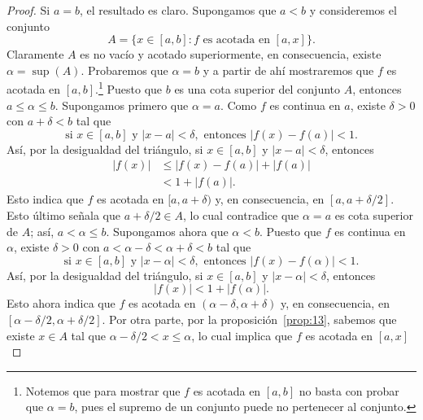 \documentclass[12pt,a4paper]{book}
\begin{document}
    \begin{proof}
        Si $a=b$, el resultado es claro. Supongamos que $a<b$ y
        consideremos el conjunto
        \begin{equation*}
            A=\{x\in[a,b]:f\text{ es acotada en }[a,x]\}.
        \end{equation*}
        Claramente $A$ es no vacío y acotado superiormente, en consecuencia, existe
        $\alpha=\sup(A)$. Probaremos que $\alpha=b$ y a partir de ahí mostraremos que $f$
        es acotada en $[a,b]$.\footnote{Notemos que para mostrar que $f$ es acotada en $[a,b]$ no basta con probar que $\alpha=b$,
        pues el supremo de un conjunto puede no pertenecer al conjunto.} Puesto que $b$ es una cota superior del conjunto $A$,
        entonces $a\leq\alpha\leq b$. Supongamos primero que $\alpha=a$. Como $f$ es continua en
        $a$, existe $\delta>0$ con $a+\delta<b$ tal que
        \begin{equation*}
            \text{si }x\in[a,b]\text{ y }|x-a|<\delta,\text{ entonces }|f(x)-f(a)|<1.
        \end{equation*}
        Así, por la desigualdad del triángulo, si $x\in[a,b]$ y $|x-a|<\delta$, entonces
        \begin{align*}
            |f(x)|&\leq|f(x)-f(a)|+|f(a)|\\
            &<1+|f(a)|.
        \end{align*}
        Esto indica que $f$ es acotada en $[a,a+\delta)$ y, en consecuencia, en $[a,a+\delta/2]$.
        Esto último señala que $a+\delta/2\in A$, lo cual contradice que $\alpha=a$ es cota
        superior de $A$; así, $a<\alpha\leq b$. Supongamos ahora que $\alpha<b$. Puesto que $f$ es
        continua en $\alpha$, existe $\delta>0$ con $a<\alpha-\delta<\alpha+\delta<b$ tal que
        \begin{equation*}
            \text{si }x\in[a,b]\text{ y }|x-\alpha|<\delta,\text{ entonces }|f(x)-f(\alpha)|<1.
        \end{equation*}
        Así, por la desigualdad del triángulo, si $x\in[a,b]$ y $|x-\alpha|<\delta$, entonces
        \begin{equation*}
            |f(x)|<1+|f(\alpha)|.
        \end{equation*}
        Esto ahora indica que $f$ es acotada en $(\alpha-\delta,\alpha+\delta)$ y, en consecuencia, en
        $[\alpha-\delta/2,\alpha+\delta/2]$. Por otra parte, por la proposición~\ref{prop:13}, sabemos que existe
        $x\in A$ tal que $\alpha-\delta/2<x\leq\alpha$, lo cual implica que $f$ es acotada en $[a,x]$

\end{proof}
\end{document}
